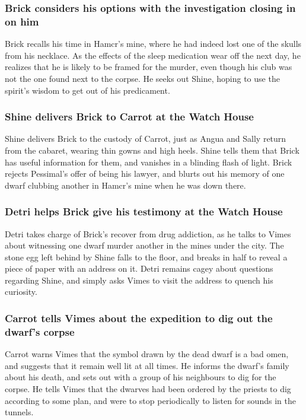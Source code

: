 \subsubsection{\Gls{Brick} considers his options with the investigation closing in on him}
\Gls{Brick} recalls his time in \Gls{Hamcr}'s mine, where he had indeed lost one of the skulls from
his necklace. As the effects of the sleep medication wear off the next day, he realizes that he is
likely to be framed for the murder, even though his club was not the one found next to the corpse.
He seeks out \Gls{Shine}, hoping to use the spirit's wisdom to get out of his predicament.

\subsubsection{\Gls{Shine} delivers \Gls{Brick} to \Gls{Carrot} at the Watch House}
\Gls{Shine} delivers \Gls{Brick} to the custody of \Gls{Carrot}, just as \Gls{Angua} and \Gls{Sally}
return from the cabaret, wearing thin gowns and high heels. \Gls{Shine} tells them that \Gls{Brick}
has useful information for them, and vanishes in a blinding flash of light. \Gls{Brick} rejects
\Gls{Pessimal}'s offer of being his lawyer, and blurts out his memory of one dwarf clubbing another
in \Gls{Hamcr}'s mine when he was down there.

\subsubsection{\Gls{Detri} helps \Gls{Brick} give his testimony at the Watch House}
\Gls{Detri} takes charge of \Gls{Brick}'s recover from drug addiction, as he talks to \Gls{Vimes}
about witnessing one dwarf murder another in the mines under the city. The stone egg left behind by
\Gls{Shine} falls to the floor, and breaks in half to reveal a piece of paper with an address on it.
\Gls{Detri} remains cagey about questions regarding \Gls{Shine}, and simply asks \Gls{Vimes} to
visit the address to quench his curiosity.

\subsubsection{\Gls{Carrot} tells \Gls{Vimes} about the expedition to dig out the dwarf's corpse}
\Gls{Carrot} warns \Gls{Vimes} that the symbol drawn by the dead dwarf is a bad omen, and suggests
that it remain well lit at all times. He informs the dwarf's family about his death, and sets out
with a group of his neighbours to dig for the corpse. He tells \Gls{Vimes} that the dwarves had been
ordered by the priests to dig according to some plan, and were to stop periodically to listen for
sounds in the tunnels.

